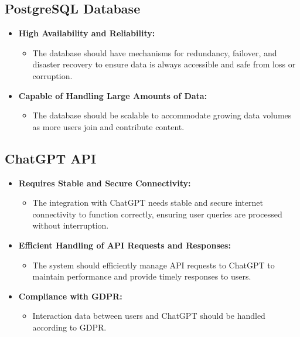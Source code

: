 \subsection*{PostgreSQL Database}
\begin{itemize}
    \item \textbf{High Availability and Reliability:}
          \begin{itemize}
              \item The database should have mechanisms for redundancy, failover, and disaster recovery to ensure data is always accessible and safe from loss or corruption.
          \end{itemize}
    \item \textbf{Capable of Handling Large Amounts of Data:}
          \begin{itemize}
              \item The database should be scalable to accommodate growing data volumes as more users join and contribute content.
          \end{itemize}
\end{itemize}

\subsection*{ChatGPT API}
\begin{itemize}
    \item \textbf{Requires Stable and Secure Connectivity:}
          \begin{itemize}
              \item The integration with ChatGPT needs stable and secure internet connectivity to function correctly, ensuring user queries are processed without interruption.
          \end{itemize}
    \item \textbf{Efficient Handling of API Requests and Responses:}
          \begin{itemize}
              \item The system should efficiently manage API requests to ChatGPT to maintain performance and provide timely responses to users.
          \end{itemize}
    \item \textbf{Compliance with GDPR:}
          \begin{itemize}
              \item Interaction data between users and ChatGPT should be handled according to GDPR.
          \end{itemize}
\end{itemize}


